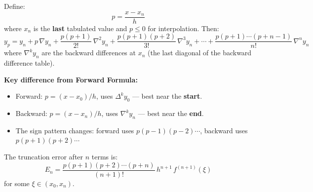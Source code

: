 \documentclass[12pt]{article}
\begin{document}
\bigskip

\begin{defbox}
Define:
\[
  p = \frac{x - x_n}{h}
\]
where $x_n$ is the \textbf{last} tabulated value and $p \leq 0$ for interpolation. Then:
\[
  \boxed{y_p = y_n + p\,\nabla y_n + \frac{p(p+1)}{2!}\,\nabla^2 y_n + \frac{p(p+1)(p+2)}{3!}\,\nabla^3 y_n + \cdots + \frac{p(p+1)\cdots(p+n-1)}{n!}\,\nabla^n y_n}
\]
where $\nabla^k y_n$ are the backward differences at $x_n$ (the last diagonal of the backward difference table).
\end{defbox}

\bigskip

\begin{keybox}
\textbf{Key difference from Forward Formula:}
\begin{itemize}[noitemsep, topsep=4pt]
  \item Forward: $p = (x-x_0)/h$, uses $\Delta^k y_0$ — best near the \textbf{start}.
  \item Backward: $p = (x-x_n)/h$, uses $\nabla^k y_n$ — best near the \textbf{end}.
  \item The sign pattern changes: forward uses $p(p-1)(p-2)\cdots$, backward uses $p(p+1)(p+2)\cdots$
\end{itemize}
\end{keybox}

\bigskip

\begin{thmbox}
The truncation error after $n$ terms is:
\[
  E_n = \frac{p(p+1)(p+2)\cdots(p+n)}{(n+1)!}\,h^{n+1}\,f^{(n+1)}(\xi)
\]
for some $\xi \in (x_0, x_n)$.
\end{thmbox}

\bigskip
\end{document}
